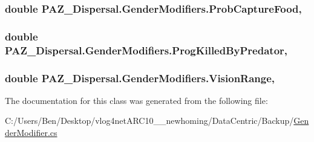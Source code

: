 \hypertarget{class_p_a_z___dispersal_1_1_gender_modifiers_a01b645bf59e17a7723dedabcc407e567}{
\subsubsection[{Prob\-Capture\-Food}]{\setlength{\rightskip}{0pt plus 5cm}double P\-A\-Z\-\_\-\-Dispersal.\-Gender\-Modifiers.\-Prob\-Capture\-Food\hspace{0.3cm}{\ttfamily [get]}, {\ttfamily [set]}}}\label{class_p_a_z___dispersal_1_1_gender_modifiers_a01b645bf59e17a7723dedabcc407e567}
\hypertarget{class_p_a_z___dispersal_1_1_gender_modifiers_ac8edbfca2f5227a54673aa6f542e9084}{
\subsubsection[{Prog\-Killed\-By\-Predator}]{\setlength{\rightskip}{0pt plus 5cm}double P\-A\-Z\-\_\-\-Dispersal.\-Gender\-Modifiers.\-Prog\-Killed\-By\-Predator\hspace{0.3cm}{\ttfamily [get]}, {\ttfamily [set]}}}\label{class_p_a_z___dispersal_1_1_gender_modifiers_ac8edbfca2f5227a54673aa6f542e9084}
\hypertarget{class_p_a_z___dispersal_1_1_gender_modifiers_ae22c63c1718e9b8d35a06aab2b6f1697}{
\subsubsection[{Vision\-Range}]{\setlength{\rightskip}{0pt plus 5cm}double P\-A\-Z\-\_\-\-Dispersal.\-Gender\-Modifiers.\-Vision\-Range\hspace{0.3cm}{\ttfamily [get]}, {\ttfamily [set]}}}\label{class_p_a_z___dispersal_1_1_gender_modifiers_ae22c63c1718e9b8d35a06aab2b6f1697}


The documentation for this class was generated from the following file\-:\begin{DoxyCompactItemize}
\item 
C\-:/\-Users/\-Ben/\-Desktop/vlog4net\-A\-R\-C10\-\_\-\_\-newhoming/\-Data\-Centric/\-Backup/\hyperlink{_backup_2_gender_modifier_8cs}{Gender\-Modifier.\-cs}\end{DoxyCompactItemize}

